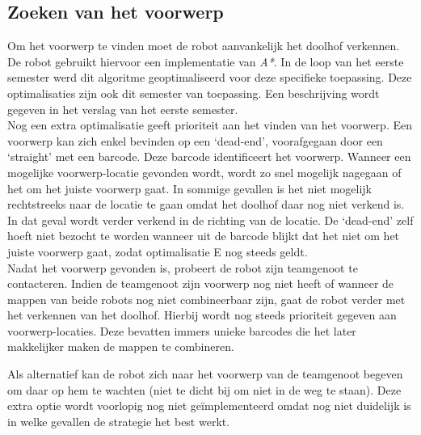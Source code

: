 \documentclass[tt1]{penoverslag}
\begin{document}
\subsection{Zoeken van het voorwerp} %
\label{ssec:algoZoek}
Om het voorwerp te vinden moet de robot aanvankelijk het doolhof verkennen. De robot gebruikt hiervoor een implementatie van \textit{A*}. In de loop van het eerste semester werd dit algoritme geoptimaliseerd voor deze specifieke toepassing. Deze optimalisaties zijn ook dit semester van toepassing. Een beschrijving wordt gegeven in het verslag van het eerste semester.\\

Nog een extra optimalisatie geeft prioriteit aan het vinden van het voorwerp. Een voorwerp kan zich enkel bevinden op een `dead-end', voorafgegaan door een `straight' met een barcode. Deze barcode identificeert het voorwerp. Wanneer een mogelijke voorwerp-locatie gevonden wordt, wordt zo snel mogelijk nagegaan of het om het juiste voorwerp gaat. In sommige gevallen is het niet mogelijk rechtstreeks naar de locatie te gaan omdat het doolhof daar nog niet verkend is. In dat geval wordt verder verkend in de richting van de locatie. De `dead-end' zelf hoeft niet bezocht te worden wanneer uit de barcode blijkt dat het niet om het juiste voorwerp gaat, zodat optimalisatie E nog steeds geldt.\\

Nadat het voorwerp gevonden is, probeert de robot zijn teamgenoot te contacteren. Indien de teamgenoot zijn voorwerp nog niet heeft of wanneer de mappen van beide robots nog niet combineerbaar zijn, gaat de robot verder met het verkennen van het doolhof. Hierbij wordt nog steeds prioriteit gegeven aan voorwerp-locaties. Deze bevatten immers unieke barcodes die het later makkelijker maken de mappen te combineren.

Als alternatief kan de robot zich naar het voorwerp van de teamgenoot begeven om daar op hem te wachten (niet te dicht bij om niet in de weg te staan). Deze extra optie wordt voorlopig nog niet ge\"implementeerd omdat nog niet duidelijk is in welke gevallen de strategie het best werkt.

\end{document}
